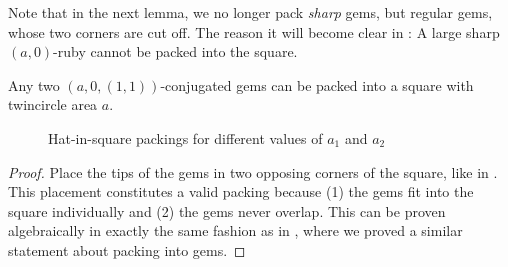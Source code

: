 \documentclass[a4paper,style=print,bibliography=totoc,nexus,lnum,extramargin]{tubsbook}
\begin{document}

Note that in the next lemma, we no longer pack \emph{sharp} gems, but regular gems, whose two corners are cut off. The reason it will become clear in : A large sharp $(a,0)$-ruby cannot be packed into the square.

\begin{lemma}\label{th:gems-in-square}
    Any two $(a,0,(1,1))$-conjugated gems can be packed into a square with twincircle area $a$.
\end{lemma}

\begin{figure}

    \vspace{5mm}


    \caption{Hat-in-square packings for different values of $a_1$ and $a_2$}
    \label{fig:gems-in-square}
\end{figure}

\begin{proof}
    Place the tips of the gems in two opposing corners of the square, like in .
    This placement constitutes a valid packing because (1) the gems fit into the square individually and (2) the gems never overlap. This can be proven algebraically in exactly the same fashion as in , where we proved a similar statement about packing into gems.
\end{proof}
\end{document}
